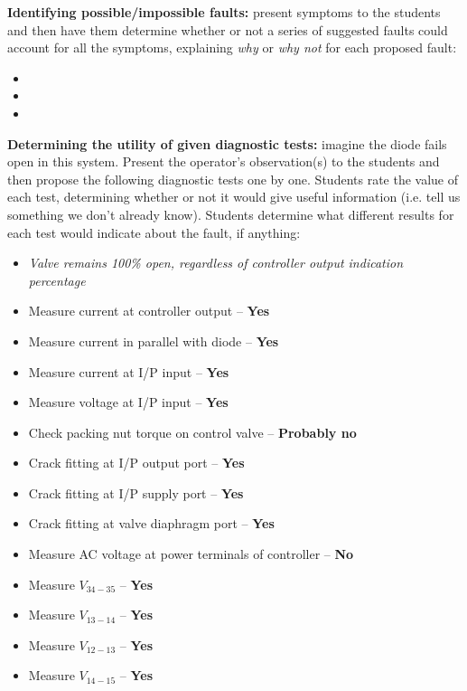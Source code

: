\vskip 10pt


\noindent
{\bf Identifying possible/impossible faults:} present symptoms to the students and then have them determine whether or not a series of suggested faults could account for all the symptoms, explaining {\it why} or {\it why not} for each proposed fault:

\begin{itemize}
\item{} 
\item{} 
\item{} 
\end{itemize}


\vskip 10pt


\noindent
{\bf Determining the utility of given diagnostic tests:} imagine the diode fails open in this system.  Present the operator's observation(s) to the students and then propose the following diagnostic tests one by one.  Students rate the value of each test, determining whether or not it would give useful information (i.e. tell us something we don't already know).  Students determine what different results for each test would indicate about the fault, if anything:

\begin{itemize}
\item{} {\it Valve remains 100\% open, regardless of controller output indication percentage}
\item{} Measure current at controller output -- {\bf Yes}
\item{} Measure current in parallel with diode -- {\bf Yes}
\item{} Measure current at I/P input -- {\bf Yes}
\item{} Measure voltage at I/P input -- {\bf Yes}
\item{} Check packing nut torque on control valve -- {\bf Probably no}
\item{} Crack fitting at I/P output port -- {\bf Yes}
\item{} Crack fitting at I/P supply port -- {\bf Yes}
\item{} Crack fitting at valve diaphragm port -- {\bf Yes}
\item{} Measure AC voltage at power terminals of controller -- {\bf No}
\item{} Measure $V_{34-35}$ -- {\bf Yes}
\item{} Measure $V_{13-14}$ -- {\bf Yes}
\item{} Measure $V_{12-13}$ -- {\bf Yes}
\item{} Measure $V_{14-15}$ -- {\bf Yes}
\end{itemize}


